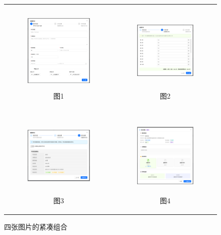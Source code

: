 \documentclass[12pt]{article}
\begin{document}
\begin{figure}[htbp]
  \centering
  \setlength{\tabcolsep}{0pt}  %
  \renewcommand{\arraystretch}{0}  %
  
  \begin{tabular}{cc}
    \begin{subfigure}[t]{0.45\textwidth}
      \includegraphics[width=\textwidth,height=4cm,keepaspectratio]{admin/createexam1.png}
      \caption*{图1}
    \end{subfigure} &
    \begin{subfigure}[t]{0.45\textwidth}
      \includegraphics[width=\textwidth,height=4cm,keepaspectratio]{admin/createexam2.png}
      \caption*{图2}
    \end{subfigure} \\
    \begin{subfigure}[t]{0.45\textwidth}
      \includegraphics[width=\textwidth,height=4cm,keepaspectratio]{admin/createexam3.png}
      \caption*{图3}
    \end{subfigure} &
    \begin{subfigure}[t]{0.45\textwidth}
      \includegraphics[width=\textwidth,height=4cm,keepaspectratio]{admin/checkexam.png}
      \caption*{图4}
    \end{subfigure}
  \end{tabular}
  
  \caption{四张图片的紧凑组合}
  \label{fig:compact-four}
\end{figure}
\end{document}
